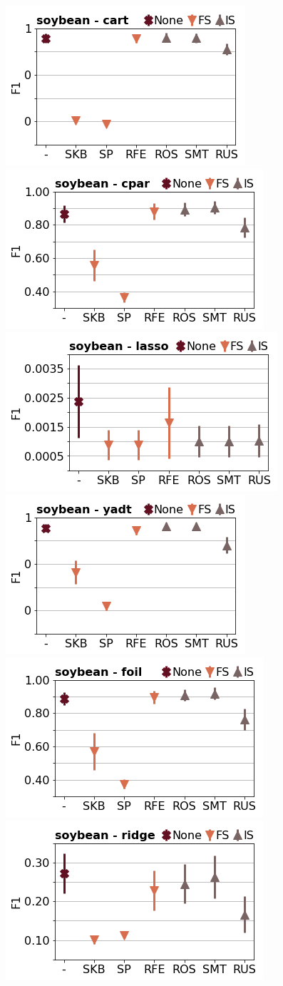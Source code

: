 \documentclass[runningheads,a4paper]{llncs}
\begin{document}
\begin{figure}[!h]
\includegraphics[width=0.32\linewidth]{fig/preps_soybean_DT_sklearn_f1score.png}
\includegraphics[width=0.32\linewidth]{fig/preps_soybean_RB_cpar_f1score.png}
\includegraphics[width=0.32\linewidth]{fig/preps_soybean_LM_lasso_f1score.png}
\includegraphics[width=0.32\linewidth]{fig/preps_soybean_DT_yadt_f1score.png}
\includegraphics[width=0.32\linewidth]{fig/preps_soybean_RB_foil_f1score.png}
\includegraphics[width=0.32\linewidth]{fig/preps_soybean_LM_ridge_f1score.png}
\end{figure}
\end{document}
